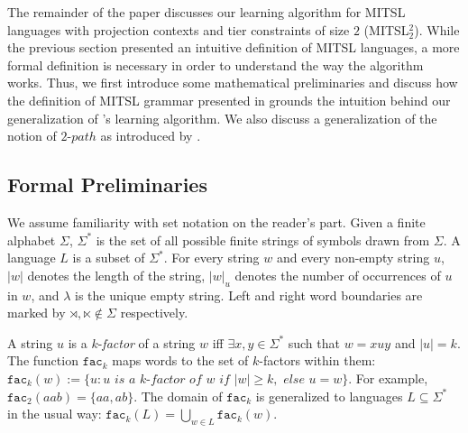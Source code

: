\documentclass[11pt,a4paper]{article}
\newcommand{\facn}[1]{\ensuremath{\texttt{fac}_{#1}}}
\begin{document}
The remainder of the paper discusses our learning algorithm for MITSL languages with projection contexts and tier constraints of size $2$ (MITSL$^2_2$).
While the previous section presented an intuitive definition of MITSL languages, a more formal definition is necessary in order to understand the way the algorithm works.
Thus, we first introduce some mathematical preliminaries and discuss how the definition of MITSL grammar presented in \citep{desanto2019structure}  grounds the intuition behind our generalization of \citet{McMullinSCIL2019}'s learning algorithm. 
We also discuss a generalization of the notion of  $2\text{-}path$ as introduced by \citet{JardineHeinz2016}.


\subsection{Formal Preliminaries}

We assume familiarity with set notation on the reader's part.
Given a finite alphabet $\Sigma$, $\Sigma^*$ is the set of all possible finite strings of symbols drawn from $\Sigma$. %
A language $L$ is a subset of $\Sigma^*$.
For every string $w$ and every non-empty string $u$, $|w|$ denotes the length of the string, $|w|_u$ denotes the number of occurrences of $u$ in $w$, and $\lambda$ is the unique empty string.
Left and right word boundaries are marked by  $\rtimes, \ltimes \notin \Sigma$ respectively.

A string $u$ is a $k$-\emph{factor} of a string $w$ iff $\exists x, y \in \Sigma^*$ such that $w=xuy$ and $|u| = k$. 
The function $\facn{k}$ maps words to the set of $k$-factors within them: $\facn{k}(w) := \{ u : u \textit{ is a $k$-factor of } w \textit{ if } |w| \geq k, \textit{ else } u = w\}$.
For example, $\facn{2}(aab) = \{ aa, ab\}$.
%
The domain of $\facn{k}$ is generalized to languages $L \subseteq \Sigma^*$ in the usual way: $\facn{k}(L) = \bigcup_{w \in L} \facn{k}(w)$.
\end{document}
